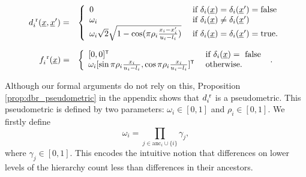\documentclass{article}
\newcommand{\vect}[1]{\underline{\smash{#1}}}
\renewcommand{\v}[1]{\vect{#1}}
\newcommand{\br}{^{\text{\textnormal{ r}}}}
\newcommand\transpose{{\textrm{\tiny{\sf{T}}}}}
\begin{document}
\begin{eqnarray}
\nonumber{}d\br_i(\v{x}, \v{x}') & = & \left\{\begin{array}{ll}
\nonumber{} 0 & \textrm{ if } \delta_i(\v{x}) = \delta_i(\v{x}') = \textrm{false}\\
\nonumber{} \omega_i & \textrm{ if } \delta_i(\v{x}) \neq \delta_i(\v{x}')\\
\nonumber{} \omega_i \sqrt{2} \sqrt{1 - \cos(\pi\rho_i \frac{x_i-x_i'}{u_i-l_i})} & \textrm{ if } \delta_i(\v{x}) = \delta_i(\v{x}') = \textrm{true}. \end{array}\right.
\end{eqnarray}

\begin{eqnarray}
\nonumber{}f_i\br(\v{x}) & = & \left\{\begin{array}{ll}
[0,0]^\transpose & \textrm{ if } \delta_i(\v{x}) = \textrm{ false }\\
\nonumber{} \omega_i [\sin{\pi\rho_i\frac{x_i}{u_i-l_i}}, \cos{\pi\rho_i\frac{x_i}{u_i-l_i}}]^\transpose & \textrm{ otherwise.}\end{array}\right..
\end{eqnarray}

Although our formal arguments do not rely on this, Proposition \ref{prop:dbr_pseudometric} in the appendix shows that $d\br_i$ is a pseudometric. 
This pseudometric is defined by two parameters: $\omega_i \in [0,1]$ and $\rho_i \in [0,1]$. We firstly define 
\begin{equation}\label{eq:gamma}
\omega_i = \prod_{j \in \text{anc}_i \cup \{i\}} \gamma_j, 
\end{equation}
where $\gamma_j \in [0,1]$. This encodes the intuitive notion that differences on lower levels of the hierarchy count less than differences in their ancestors.
\end{document}
